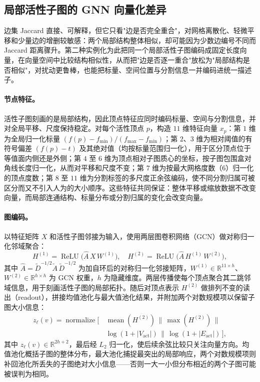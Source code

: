 \documentclass[twocolumn, a4paper, 10pt]{article}
\begin{document}
\subsection{局部活性子图的 GNN 向量化差异}
\label{sec:gnn}

边集 Jaccard 直接、可解释，但它只看"边是否完全重合"，对网格离散化、轻微平移和少量边的增删较敏感：两个局部结构整体相似，却可能因为少数边编号不同而 Jaccard 距离骤升。第二种实例化为此把同一个局部活性子图编码成固定长度向量，在向量空间中比较结构相似性，从而把"边是否逐一重合"放松为"局部结构是否相似"，对扰动更鲁棒，也能把标量、空间位置与分割信息一并编码进统一描述子。

\paragraph{节点特征。}活性子图刻画的是局部结构，因此顶点特征应同时编码标量、空间与分割信息，并对全局平移、尺度保持稳定。对每个活性顶点 $p$，构造 $11$ 维特征向量 $x_p$：第 $1$ 维为全局归一化标量 $(f(p)-f_{\min})/(f_{\max}-f_{\min})$；第 $2$、$3$ 维为相对阈值的有符号偏差 $(f(p)-t)$ 及其绝对值（均按标量范围归一化），用于区分顶点位于等值面内侧还是外侧；第 $4$ 至 $6$ 维为顶点相对子图质心的坐标，按子图包围盒对角线长度归一化，从而对平移和尺度不变；第 $7$ 维为按最大网格度数（$6$）归一化的顶点度数；第 $8$ 至 $11$ 维为分割标签的多尺度正余弦编码，使不同分割归属可被区分而又不引入人为的大小顺序。这些特征共同保证：整体平移或缩放数据不改变向量，而局部连通结构、标量分布或分割归属的变化会改变向量。

\paragraph{图编码。}以特征矩阵 $X$ 和活性子图邻接为输入，使用两层图卷积网络（GCN）做对称归一化邻域聚合：
\begin{equation}
H^{(1)}=\operatorname{ReLU}\bigl(\hat{A}\,X\,W^{(1)}\bigr),\quad
H^{(2)}=\operatorname{ReLU}\bigl(\hat{A}\,H^{(1)}\,W^{(2)}\bigr),
\label{eq:gcn}
\end{equation}
其中 $\hat{A}=\tilde{D}^{-1/2}\tilde{A}\,\tilde{D}^{-1/2}$ 为加自环后的对称归一化邻接矩阵，$W^{(1)}\in\mathbb{R}^{11\times h}$、$W^{(2)}\in\mathbb{R}^{h\times h}$ 为 GCN 权重，$h$ 为隐藏维度。两层传播使每个顶点聚合其二跳邻域信息，用于刻画活性子图的局部拓扑。随后对顶点表示 $H^{(2)}$ 做排列不变的读出（readout），拼接均值池化与最大值池化结果，并附加两个对数规模项以保留子图大小信息：
\begin{equation}
\begin{aligned}
z_\ell(v)=\operatorname{normalize}\bigl[\,&\operatorname{mean}(H^{(2)})\,\big\|\,\operatorname{max}(H^{(2)})\,\big\|\\[-2pt]
&\log(1{+}|V_{\mathrm{act}}|)\,\big\|\,\log(1{+}|E_{\mathrm{act}}|)\,\bigr],
\end{aligned}
\label{eq:readout}
\end{equation}
其中 $z_\ell(v)\in\mathbb{R}^{2h+2}$，最后经 $L_2$ 归一化，使后续余弦比较只关注向量方向。均值池化概括子图的整体分布，最大池化捕捉最突出的局部响应，两个对数规模项则补回池化所丢失的子图绝对大小信息——否则一大一小但分布相近的两个子图可能被误判为相同。
\end{document}
